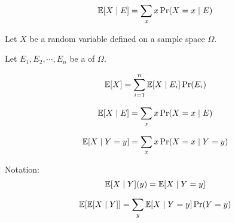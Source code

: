 
\begin{frame}{}
  \centerline{}

  \begin{definition}
    \[
      \operatorname*{\mathbb{E}}[X \mid E] = \sum_{x} x \Pr(X = x \mid E)
    \]
  \end{definition}
\end{frame}

\begin{frame}{}
  \begin{theorem}
    Let $X$ be a random variable defined on a sample space $\Omega$.

    Let $E_1, E_2, \cdots, E_n$ be a  of $\Omega$.

    \[
      \operatorname*{\mathbb{E}}[X] = \sum_{i=1}^{n} \operatorname*{\mathbb{E}}[X \mid E_i] \Pr(E_i)
    \]
  \end{theorem}

\end{frame}

\begin{frame}{}
  \begin{definition}
    \[
      \operatorname*{\mathbb{E}}[X \mid E] = \sum_{x} x \Pr(X = x \mid E)
    \]
  \end{definition}

  \pause
  \vspace{0.50cm}
  \begin{definition}
    \[
      \operatorname*{\mathbb{E}}[X \mid Y = y] = \sum_{x} x \Pr(X = x \mid Y = y)
    \]
  \end{definition}
\end{frame}

\begin{frame}{}
  \begin{alertblock}{Notation:}
    \[
      \operatorname*{\mathbb{E}}[X \mid Y](y) = \operatorname*{\mathbb{E}}[X \mid Y = y]
    \]
  \end{alertblock}

  \pause
  \[
    \operatorname*{\mathbb{E}}[\operatorname*{\mathbb{E}}[X \mid Y]] = \sum_{y} \operatorname*{\mathbb{E}}[X \mid Y = y] \Pr(Y = y)
  \]
\end{frame}

\begin{frame}{}
\end{frame}
